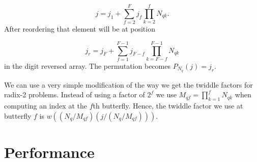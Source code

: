 \documentclass{article}
\begin{document}
\begin{equation}
  j = j_1 + \sum_{f=2}^F j_f \prod_{k=2}^f N_{qk} .
\end{equation}
%
After reordering that element will be at position

\begin{equation}
  j_r = j_F +\sum_{f=1}^{F-1} j_{F-f} \prod_{k=F-f}^{F-1} N_{qk}
\end{equation}
%
in the digit reversed array.  The permutation becomes $P_{N_q}(j) =
j_r$.

We can use a very simple modification of the way we get the twiddle
factors for radix-2 problems.  Instead of using a factor of $2^f$ we
use $M_{qf} = \prod_{k=1}^f N_{qk}$ when computing an index at the
$f$th butterfly.  Hence, the twiddle factor we use at butterfly $f$ is
$w((N_q/M_{qf})(j/(N_q/M_{qf})))$.

\section{Performance}
\label{sec:performance}



\begin{thebibliography}{99}

\end{thebibliography}

\appendix

\end{document}
